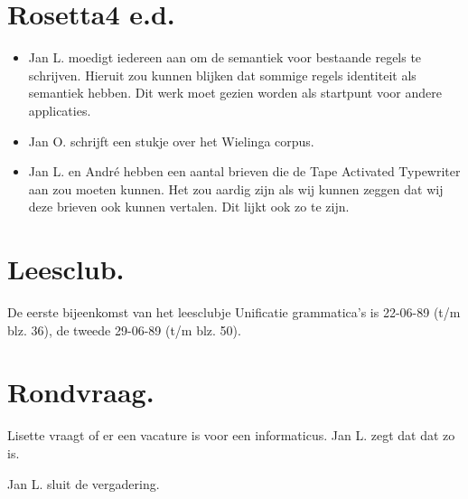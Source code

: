 \section{Rosetta4 e.d.}
\begin{itemize}
  \item Jan L. moedigt iedereen aan om de semantiek voor bestaande regels te 
schrijven. Hieruit zou kunnen blijken dat sommige regels identiteit als 
semantiek hebben. Dit werk moet gezien worden als startpunt voor andere
applicaties. 
  \item Jan O. schrijft een stukje over het Wielinga corpus.
  \item Jan L. en Andr\'{e} hebben een aantal brieven die de Tape Activated
Typewriter aan zou moeten kunnen. Het zou aardig zijn als wij kunnen zeggen
dat wij deze brieven ook kunnen vertalen. Dit lijkt ook zo te zijn.
\end{itemize}

\section{Leesclub.}
De eerste bijeenkomst van het leesclubje Unificatie grammatica's is 22-06-89
(t/m blz. 36), de tweede 29-06-89 (t/m blz. 50).

\section{Rondvraag.}
Lisette vraagt of er een vacature is voor een informaticus. Jan L. zegt dat dat 
zo is.

Jan L. sluit de vergadering.

